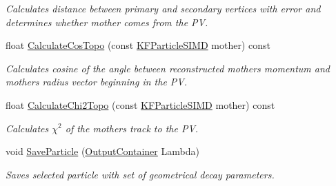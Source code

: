 \begin{DoxyCompactItemize}
\begin{DoxyCompactList}\small\item\em Calculates distance between primary and secondary vertices with error and determines whether mother comes from the PV. \end{DoxyCompactList}\item 
float \hyperlink{classSimpleFinder_a874a6c11539d459f53e86c364c0f2892}{Calculate\+Cos\+Topo} (const \hyperlink{classKFParticleSIMD}{K\+F\+Particle\+S\+I\+MD} mother) const \hypertarget{classSimpleFinder_a874a6c11539d459f53e86c364c0f2892}{}\label{classSimpleFinder_a874a6c11539d459f53e86c364c0f2892}

\begin{DoxyCompactList}\small\item\em Calculates cosine of the angle between reconstructed mother\textquotesingle{}s momentum and mother\textquotesingle{}s radius vector beginning in the PV. \end{DoxyCompactList}\item 
float \hyperlink{classSimpleFinder_a8f5b04879c31465d5ef061f43bc5a74a}{Calculate\+Chi2\+Topo} (const \hyperlink{classKFParticleSIMD}{K\+F\+Particle\+S\+I\+MD} mother) const \hypertarget{classSimpleFinder_a8f5b04879c31465d5ef061f43bc5a74a}{}\label{classSimpleFinder_a8f5b04879c31465d5ef061f43bc5a74a}

\begin{DoxyCompactList}\small\item\em Calculates $\chi^2$ of the mother\textquotesingle{}s track to the PV. \end{DoxyCompactList}\item 
void \hyperlink{classSimpleFinder_af48bcd80810a3c514379ebd68f88f83c}{Save\+Particle} (\hyperlink{classOutputContainer}{Output\+Container} Lambda)\hypertarget{classSimpleFinder_af48bcd80810a3c514379ebd68f88f83c}{}\label{classSimpleFinder_af48bcd80810a3c514379ebd68f88f83c}

\begin{DoxyCompactList}\small\item\em Saves selected particle with set of geometrical decay parameters. \end{DoxyCompactList}\end{DoxyCompactItemize}
